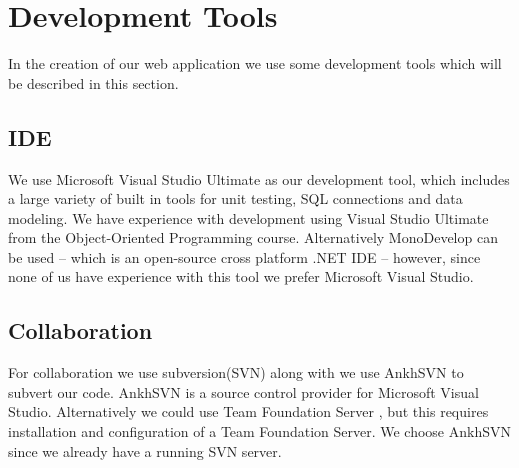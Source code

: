 \section{Development Tools}
In the creation of our web application we use some development tools which will be described in this section. 

\subsection{IDE}
\label{sub:ide}
We use Microsoft Visual Studio Ultimate \cite{visualStudio} as our development tool, which includes a large variety of built in tools for unit testing, SQL connections and data modeling. 
We have experience with development using Visual Studio Ultimate from the Object-Oriented Programming course. 
Alternatively MonoDevelop \cite{mono} can be used -- which is an open-source cross platform .NET IDE -- however, since none of us have experience with this tool we prefer Microsoft Visual Studio.



\subsection{Collaboration}
\label{sub:collaboration}
For collaboration we use subversion(SVN)  along with we use AnkhSVN \cite{ankhsvn} to subvert our code. 
AnkhSVN is a source control provider for Microsoft Visual Studio. 
Alternatively we could use Team Foundation Server \cite{teamfoundation}, but this requires installation and configuration of a Team Foundation Server. 
We choose AnkhSVN since we already have a running SVN server. 



